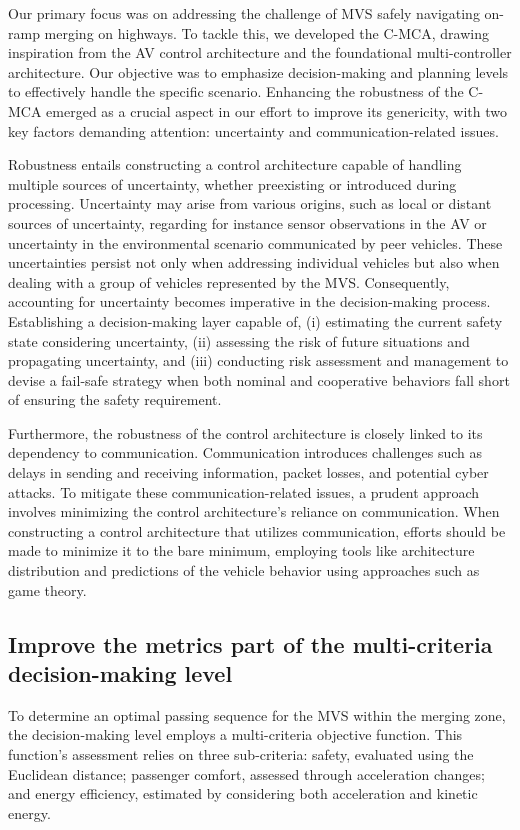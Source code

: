 Our primary focus was on addressing the challenge of MVS safely navigating on-ramp merging on highways. To tackle this, we developed the C-MCA, drawing inspiration from the AV control architecture and the foundational multi-controller architecture. Our objective was to emphasize decision-making and planning levels to effectively handle the specific scenario. Enhancing the robustness of the C-MCA emerged as a crucial aspect in our effort to improve its genericity, with two key factors demanding attention: uncertainty and communication-related issues. 


Robustness entails constructing a control architecture capable of handling multiple sources of uncertainty, whether preexisting or introduced during processing. Uncertainty may arise from various origins, such as local or distant sources of uncertainty, regarding for instance sensor observations in the AV or uncertainty in the environmental scenario communicated by peer vehicles. These uncertainties persist not only when addressing individual vehicles but also when dealing with a group of vehicles represented by the MVS. Consequently, accounting for uncertainty becomes imperative in the decision-making process. Establishing a decision-making layer capable of, (i) estimating the current safety state considering uncertainty, (ii) assessing the risk of future situations and propagating uncertainty, and (iii) conducting risk assessment and management to devise a fail-safe strategy when both nominal and cooperative behaviors fall short of ensuring the safety requirement. 



Furthermore, the robustness of the control architecture is closely linked to its dependency to communication. Communication introduces challenges such as delays in sending and receiving information, packet losses, and potential cyber attacks. To mitigate these communication-related issues, a prudent approach involves minimizing the control architecture's reliance on communication. When constructing a control architecture that utilizes communication, efforts should be made to minimize it to the bare minimum, employing tools like architecture distribution and predictions of the vehicle behavior using approaches such as game theory. 











\subsection*{Improve the metrics part of the multi-criteria decision-making level}
To determine an optimal passing sequence for the MVS within the merging zone, the decision-making level employs a multi-criteria objective function. This function's assessment relies on three sub-criteria: safety, evaluated using the Euclidean distance; passenger comfort, assessed through acceleration changes; and energy efficiency, estimated by considering both acceleration and kinetic energy. 

